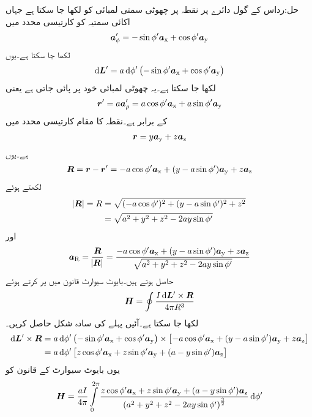 حل:رداس  کے گول دائرے پر نقطہ  پر چھوٹی سمتی لمبائی کو  لکھا جا سکتا ہے جہاں اکائی سمتیہ  کو کارتیسی محدد میں
\begin{align*}
{\boldsymbol{a}}_{\phi}'=-\sin \phi' {\boldsymbol{a}}_{\textup{x}}+\cos \phi' {\boldsymbol{a}}_{\textup{y}} 
\end{align*}
لکھا جا سکتا ہے۔یوں
\begin{align*}
\dif \kvec{L}'= a \dif \phi' \left(-\sin \phi' \ax+\cos \phi' \ay  \right)
\end{align*}
لکھا جا سکتا ہے۔یہ چھوٹی لمبائی خود  پر پائی جاتی ہے یعنی
\begin{align*}
{\ensuremath{{\boldsymbol{r}}}}'=a {\boldsymbol{a}}_{\rho}'=a\cos \phi' {\boldsymbol{a}}_{\textup{x}}+a\sin \phi' {\boldsymbol{a}}_{\textup{y}}
\end{align*}
کے برابر ہے۔نقطہ  کا مقام کارتیسی محدد میں
\begin{align*}
{\ensuremath{{\boldsymbol{r}}}}=y{\boldsymbol{a}}_{\textup{y}}+z{\boldsymbol{a}}_{\textup{z}}
\end{align*}
ہے۔یوں
\begin{align*}
{\ensuremath{{\boldsymbol{R}}}}={{\boldsymbol{r}}}-{{\boldsymbol{r}}}'=-a\cos \phi' {\boldsymbol{a}}_{\textup{x}}+(y-a\sin \phi'){\boldsymbol{a}}_{\textup{y}}+z{\boldsymbol{a}}_{\textup{z}}
\end{align*}
لکھتے ہوئے
\begin{align*}
\abs{{{\boldsymbol{R}}}}=R&=\sqrt{(-a\cos \phi')^2+(y-a\sin \phi')^2+z^2}\\
&=\sqrt{a^2+y^2+z^2-2 a y\sin \phi'}
\end{align*}
اور
\begin{align*}
{\boldsymbol{a}}_{\textup{R}}=\frac{{{\boldsymbol{R}}}}{\abs{{{\boldsymbol{R}}}}}=\frac{-a\cos \phi' {\boldsymbol{a}}_{\textup{x}}+(y-a\sin \phi'){\boldsymbol{a}}_{\textup{y}}+z{\boldsymbol{a}}_{\textup{z}}}{\sqrt{a^2+y^2+z^2-2 a y\sin \phi'}}
\end{align*}
حاصل ہوتے ہیں۔بایوٹ سیوارٹ قانون میں   پر کرتے ہوئے 
\begin{align*}
\kvec{H}=\oint \frac{I \dif \kvec{L}' \times \kvec{R}}{4\pi R^3}
\end{align*}
لکھا جا سکتا ہے۔آئیں پہلے  کی سادہ شکل حاصل کریں۔
\begin{align*}
\dif \kvec{L}' \times \kvec{R}&=a \dif \phi' \left(-\sin \phi' \ax+\cos \phi' \ay  \right) \times \left[-a\cos \phi' \ax+(y-a\sin \phi')\ay+z\az \right]\\
&=a \dif \phi' \left[z\cos \phi' \ax+z\sin \phi' \ay+(a-y\sin\phi')\az \right]
\end{align*}
یوں بایوٹ سیوارٹ کے قانون کو
\begin{align*}
\kvec{H}=\frac{a I}{4\pi}\int \limits_{0}^{2\pi} \frac{z\cos \phi' \ax+z\sin \phi' \ay+(a-y\sin\phi')\az}{\left(a^2+y^2+z^2-2 a y\sin \phi'\right)^{\frac{3}{2}}} \dif \phi'
\end{align*}
